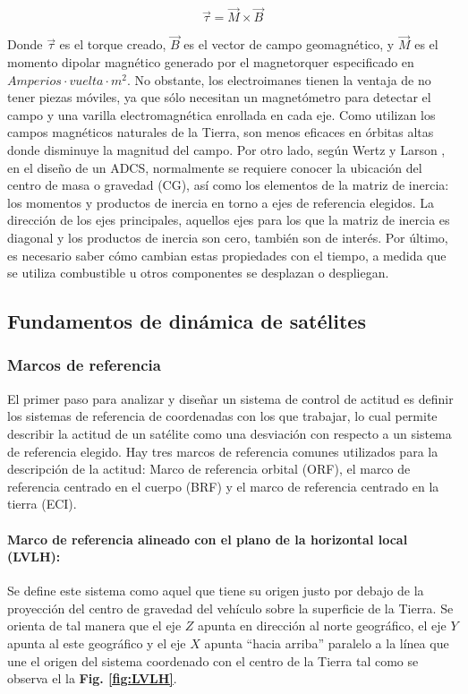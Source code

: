 \begin{equation}\label{eq:torque_mgt}
	\vec{\tau} = \vec{M}\times\vec{B}	
\end{equation}


Donde $\vec{\tau}$ es el torque creado, $\vec{B}$ es el vector de campo geomagnético, y $\vec{M}$ es el momento dipolar magnético generado por el magnetorquer especificado en $Amperios\cdot vuelta\cdot m^2$. No obstante, los electroimanes tienen la ventaja de no tener piezas móviles, ya que sólo necesitan un magnetómetro para detectar el campo y una varilla electromagnética enrollada en cada eje. Como utilizan los campos magnéticos naturales de la Tierra, son menos eficaces en órbitas altas donde disminuye la magnitud del campo.
Por otro lado, según Wertz y Larson \cite{Wertz1999} , en el diseño de un ADCS, normalmente se requiere conocer la ubicación del centro de masa o gravedad (CG), así como los elementos de la matriz de inercia: los momentos y productos de inercia en torno a ejes de referencia elegidos. La dirección de los ejes principales, aquellos ejes para los que la matriz de inercia es diagonal y los productos de inercia son cero, también son de interés. Por último, es necesario saber cómo cambian estas propiedades con el tiempo, a medida que se utiliza combustible u otros componentes se desplazan o despliegan.

\subsection{Fundamentos de dinámica de satélites}

\subsubsection{Marcos de referencia}
\hfill \break
El primer paso para analizar y diseñar un sistema de control de actitud es definir los sistemas de referencia de coordenadas con los que trabajar, lo cual permite describir la actitud de un satélite como una desviación con respecto a un sistema de referencia elegido. Hay tres marcos de referencia comunes utilizados para la descripción de la actitud: Marco de referencia orbital (ORF), el marco de referencia centrado en el cuerpo (BRF) y el marco de referencia centrado en la tierra (ECI). 

\paragraph{Marco de referencia alineado con el plano de la horizontal local (LVLH):} Se define este sistema como aquel que tiene su origen justo por debajo de la proyección del centro de gravedad del vehículo sobre la superficie de la Tierra. Se orienta de tal manera que el eje $Z$ apunta en dirección al norte
geográfico, el eje $Y$ apunta al este geográfico y el eje $X$ apunta “hacia arriba”
paralelo a la línea que une el origen del sistema coordenado con el centro de la
Tierra tal como se observa el la \textbf{Fig. \ref{fig:LVLH}}.

